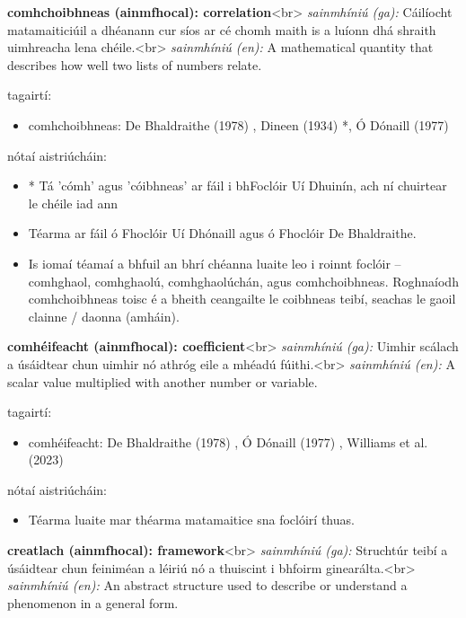 \documentclass{article}
\begin{document}
\textbf{comhchoibhneas (ainmfhocal): correlation}<br>
\textit{sainmhíniú (ga):} Cáilíocht matamaiticiúil a dhéanann cur síos ar cé chomh maith is a luíonn dhá shraith uimhreacha lena chéile.<br>
\textit{sainmhíniú (en):} A mathematical quantity that describes how well two lists of numbers relate.

tagairtí:
\begin{itemize}
	\item comhchoibhneas: De Bhaldraithe (1978) \cite{de-bhaldraithe}, Dineen (1934) \cite{dineen}*, Ó Dónaill (1977) \cite{odonaill}
\end{itemize}

nótaí aistriúcháin:
\begin{itemize}
	\item * Tá 'cómh' agus 'cóibhneas' ar fáil i bhFoclóir Uí Dhuinín, ach ní chuirtear le chéile iad ann
	\item Téarma ar fáil ó Fhoclóir Uí Dhónaill agus ó Fhoclóir De Bhaldraithe.
	\item Is iomaí téamaí a bhfuil an bhrí chéanna luaite leo i roinnt foclóir -- comhghaol, comhghaolú, comhghaolúchán, agus comhchoibhneas. Roghnaíodh comhchoibhneas toisc é a bheith ceangailte le coibhneas teibí, seachas le gaoil clainne / daonna (amháin).
\end{itemize}


\textbf{comhéifeacht (ainmfhocal): coefficient}<br>
\textit{sainmhíniú (ga):} Uimhir scálach a úsáidtear chun uimhir nó athróg eile a mhéadú fúithi.<br>
\textit{sainmhíniú (en):} A scalar value multiplied with another number or variable.

tagairtí:
\begin{itemize}
	\item comhéifeacht: De Bhaldraithe (1978) \cite{de-bhaldraithe}, Ó Dónaill (1977) \cite{odonaill}, Williams et al. (2023) \cite{storchiste}
\end{itemize}

nótaí aistriúcháin:
\begin{itemize}
	\item Téarma luaite mar théarma matamaitice sna foclóirí thuas.
\end{itemize}


\textbf{creatlach (ainmfhocal): framework}<br>
\textit{sainmhíniú (ga):} Struchtúr teibí a úsáidtear chun feiniméan a léiriú nó a thuiscint i bhfoirm ginearálta.<br>
\textit{sainmhíniú (en):} An abstract structure used to describe or understand a phenomenon in a general form.
\end{document}
